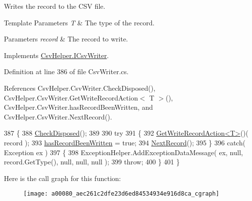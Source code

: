 Writes the record to the C\-S\-V file. 


\begin{DoxyTemplParams}{Template Parameters}
{\em T} & The type of the record.\\
\hline
\end{DoxyTemplParams}

\begin{DoxyParams}{Parameters}
{\em record} & The record to write.\\
\hline
\end{DoxyParams}


Implements \hyperlink{a00114_a9620a114ee9e858760f74013cf341f3a}{Csv\-Helper.\-I\-Csv\-Writer}.



Definition at line 386 of file Csv\-Writer.\-cs.



References Csv\-Helper.\-Csv\-Writer.\-Check\-Disposed(), Csv\-Helper.\-Csv\-Writer.\-Get\-Write\-Record\-Action$<$ T $>$(), Csv\-Helper.\-Csv\-Writer.\-has\-Record\-Been\-Written, and Csv\-Helper.\-Csv\-Writer.\-Next\-Record().


\begin{DoxyCode}
387         \{
388             \hyperlink{a00080_a15e26ec8c5c935030677bee9a36d7c16}{CheckDisposed}();
389 
390             \textcolor{keywordflow}{try}
391             \{
392                 \hyperlink{a00080_a147c7b5888823fdf81fb021db706181c}{GetWriteRecordAction<T>}()( record );
393                 \hyperlink{a00080_a0c31cd2b7d4eea93db887a46c33344fb}{hasRecordBeenWritten} = \textcolor{keyword}{true};
394                 \hyperlink{a00080_a397af8c87002d3b9c2b5152c6981d4d2}{NextRecord}();
395             \}
396             \textcolor{keywordflow}{catch}( Exception ex )
397             \{
398                 ExceptionHelper.AddExceptionDataMessage( ex, null, record.GetType(), null, null, null );
399                 \textcolor{keywordflow}{throw};
400             \}
401         \}
\end{DoxyCode}


Here is the call graph for this function\-:
\nopagebreak
\begin{figure}[H]
\begin{center}
\leavevmode
\texttt{[image: a00080\_aec261c2dfe23d6ed84534934e916d8ca\_cgraph]}
\end{center}
\end{figure}


